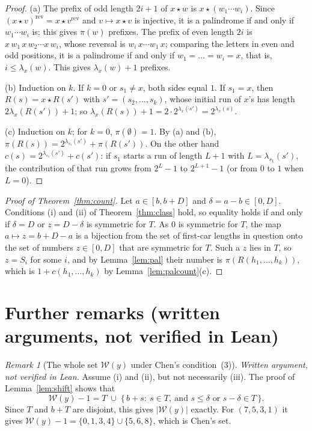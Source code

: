 \documentclass[11pt]{article}
\theoremstyle{remark}
\newtheorem{remark}{Remark}
\newcommand{\W}{\mathcal W}
\begin{document}
\begin{proof}
(a) The prefix of odd length $2i+1$ of $x\star w$ is $x\star(w_1\cdots w_i)$.
Since $(x\star v)^{\mathrm{rev}}=x\star v^{\mathrm{rev}}$ and $v\mapsto x\star v$
is injective, it is a palindrome if and only if $w_1\cdots w_i$ is; this gives
$\pi(w)$ prefixes. The prefix of even length $2i$ is
$x\,w_1\,x\,w_2\cdots x\,w_i$, whose reversal is $w_i\,x\cdots w_1\,x$;
comparing the letters in even and odd positions, it is a palindrome if and
only if $w_1=\dots=w_i=x$, that is, $i\le\lambda_x(w)$. This gives
$\lambda_x(w)+1$ prefixes.

(b) Induction on $k$. If $k=0$ or $s_1\ne x$, both sides equal $1$. If
$s_1=x$, then $R(s)=x\star R(s')$ with $s'=(s_2,\dots,s_k)$, whose initial run
of $x$'s has length $2\lambda_x(R(s'))+1$; so
$\lambda_x(R(s))+1=2\cdot2^{\lambda_x(s')}=2^{\lambda_x(s)}$.

(c) Induction on $k$; for $k=0$, $\pi(\emptyset)=1$. By (a) and (b),
$\pi(R(s))=2^{\lambda_{s_1}(s')}+\pi(R(s'))$. On the other hand
$c(s)=2^{\lambda_{s_1}(s')}+c(s')$: if $s_1$ starts a run of length $L+1$ with
$L=\lambda_{s_1}(s')$, the contribution of that run grows from $2^L-1$ to
$2^{L+1}-1$ (or from $0$ to $1$ when $L=0$).
\end{proof}

\begin{proof}[Proof of Theorem~\ref{thm:count}]
Let $a\in[b,b+D]$ and $\delta=a-b\in[0,D]$. Conditions (i) and (ii) of
Theorem~\ref{thm:class} hold, so equality holds if and only if $\delta=D$ or
$z=D-\delta$ is symmetric for $T$. As $0$ is symmetric for $T$, the map
$a\mapsto z=b+D-a$ is a bijection from the set of first-car lengths in question
onto the set of numbers $z\in[0,D]$ that are symmetric for $T$. Such a $z$ lies
in $T$, so $z=S_i$ for some $i$, and by Lemma~\ref{lem:pal} their number is
$\pi(R(h_1,\dots,h_k))$, which is $1+c(h_1,\dots,h_k)$ by
Lemma~\ref{lem:palcount}(c).
\end{proof}

\section{Further remarks (written arguments, not verified in Lean)}\label{sec:remarks}

\begin{remark}[The whole set $\W(y)$ under Chen's condition~(3)]\label{rem:Wformula}
\emph{Written argument, not verified in Lean.} Assume (i) and (ii), but not
necessarily (iii). The proof of Lemma~\ref{lem:shift} shows that
\[
\W(y)-1=T\;\cup\;\{\,b+s:\ s\in T,\ \text{and } s\le\delta\text{ or } s-\delta\in T\,\}.
\]
Since $T$ and $b+T$ are disjoint, this gives $|\W(y)|$ exactly. For
$(7,5,3,1)$ it gives $\W(y)-1=\{0,1,3,4\}\cup\{5,6,8\}$, which is Chen's set.
\end{remark}
\end{document}
